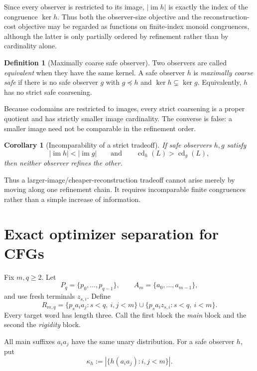\documentclass[11pt]{article}
\newtheorem{corollary}[theorem]{Corollary}
\theoremstyle{definition}
\newtheorem{definition}[theorem]{Definition}
\theoremstyle{remark}
\newcommand{\im}{\operatorname{im}}
\newcommand{\cd}{\operatorname{cd}}
\begin{document}
Since every observer is restricted to its image, \(|\im h|\) is exactly the
index of the congruence \(\ker h\).  Thus both the observer-size objective
and the reconstruction-cost objective may be regarded as functions on
finite-index monoid congruences, although the latter is only partially ordered
by refinement rather than by cardinality alone.

\begin{definition}[Maximally coarse safe observer]
Two observers are called \emph{equivalent} when they have the same kernel.
A safe observer \(h\) is \emph{maximally coarse safe} if there is no safe observer
\(g\) with \(g\preceq h\) and \(\ker h\subsetneq\ker g\).  Equivalently,
\(h\) has no strict safe coarsening.
\end{definition}

Because codomains are restricted to images, every strict coarsening is a
proper quotient and has strictly smaller image cardinality.  The converse is
false: a smaller image need not be comparable in the refinement order.

\begin{corollary}[Incomparability of a strict tradeoff]
\label{cor:incomp}
If safe observers \(h,g\) satisfy
\[
 |\im h|<|\im g|
 \qquad\text{and}\qquad
 \cd_h(L)>\cd_g(L),
\]
then neither observer refines the other.
\end{corollary}

Thus a larger-image/cheaper-reconstruction tradeoff cannot arise merely by
moving along one refinement chain.  It requires incomparable finite
congruences rather than a simple increase of information.

\section{Exact optimizer separation for CFGs}
\label{sec:R}

Fix \(m,q\ge2\).  Let
\[
 P_q=\{p_0,\ldots,p_{q-1}\},\qquad
 A_m=\{a_0,\ldots,a_{m-1}\},
\]
and use fresh terminals \(z_{s,i}\).  Define
\[
 R_{m,q}
 =
 \{p_sa_i a_j:s<q,\ i,j<m\}
 \cup
 \{p_sa_i z_{s,i}:s<q,\ i<m\}.
\]
Every target word has length three.  Call the first block the \emph{main}
block and the second the \emph{rigidity} block.

All main suffixes \(a_i a_j\) have the same unary distribution.  For a safe
observer \(h\), put
\[
 \kappa_h:=|\{h(a_i a_j):i,j<m\}|.
\]
\end{document}

